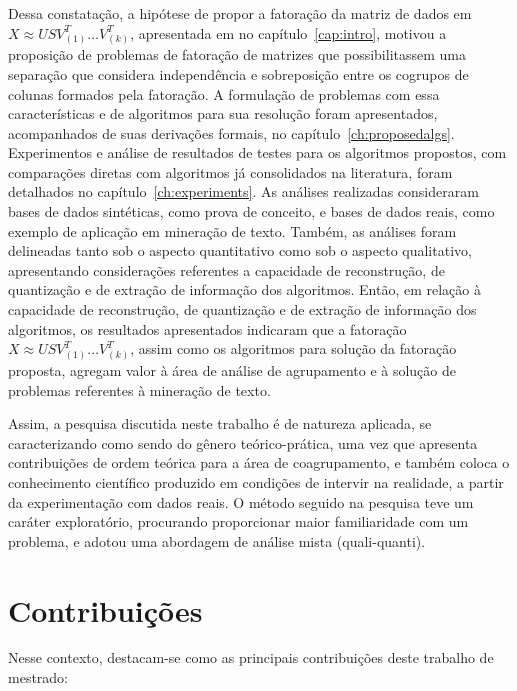 \documentclass[
    12pt,                %
    oneside,            %
    a4paper,            %
    english,            %
    brazil                %
    ]{abntex2ppgsi}
\begin{document}
Dessa constatação, a hipótese de propor a fatoração da matriz de dados em $X \approx USV_{(1)}^T \dots V_{(k)}^T$, apresentada em no capítulo~\ref{cap:intro}, motivou a proposição de problemas de fatoração de matrizes que possibilitassem uma separação que considera independência e sobreposição entre os cogrupos de colunas formados pela fatoração.
A formulação de problemas com essa características e de algoritmos para sua resolução foram apresentados, acompanhados de suas derivações formais, no capítulo~\ref{ch:proposedalgs}.
Experimentos e análise de resultados de testes para os algoritmos propostos, com comparações diretas com algoritmos já consolidados na literatura, foram detalhados no capítulo~\ref{ch:experiments}.
As análises realizadas consideraram bases de dados sintéticas, como prova de conceito, e bases de dados reais, como exemplo de aplicação em mineração de texto.
Também, as análises foram delineadas tanto sob o aspecto quantitativo como sob o aspecto qualitativo, apresentando considerações referentes a capacidade de reconstrução, de quantização e de extração de informação dos algoritmos.
Então, em relação à capacidade de reconstrução, de quantização e de extração de informação dos algoritmos, os resultados apresentados indicaram que a fatoração $X \approx USV_{(1)}^T \dots V_{(k)}^T$, assim como os algoritmos para solução da fatoração proposta, agregam valor à área de análise de agrupamento e à solução de problemas referentes à mineração de texto.

Assim, a pesquisa discutida neste trabalho é de natureza aplicada, se caracterizando como sendo do gênero teórico-prática, uma vez que apresenta contribuições de ordem teórica para a área de coagrupamento, e também coloca o conhecimento científico produzido em condições de intervir na realidade, a partir da experimentação com dados reais. O método seguido na pesquisa teve um caráter exploratório, procurando proporcionar maior familiaridade com um problema, e adotou uma abordagem de análise mista (quali-quanti).

\section{Contribuições}

Nesse contexto, destacam-se como as principais contribuições deste trabalho de mestrado:
\end{document}
